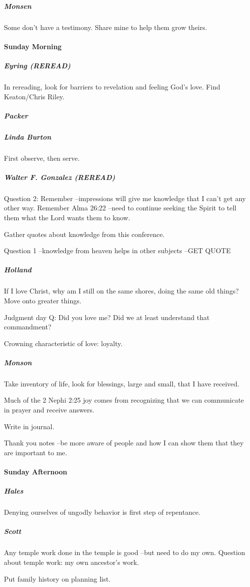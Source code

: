 \subparagraph*{Monsen} Some don't have a testimony. Share mine to help them grow theirs.

\paragraph*{Sunday Morning}

\subparagraph*{Eyring (REREAD)} In rereading, look for barriers to revelation and feeling God's love. Find Keaton/Chris Riley.

\subparagraph*{Packer}

\subparagraph*{Linda Burton} First observe, then serve.

\subparagraph*{Walter F. Gonzalez (REREAD)} Question 2: Remember --impressions will give me knowledge that I can't get any other way. Remember Alma 26:22 --need to continue seeking the Spirit to tell them what the Lord wants them to know.

Gather quotes about knowledge from this conference.

Question 1 --knowledge from heaven helps in other subjects --GET QUOTE

\subparagraph*{Holland} If I love Christ, why am I still on the same shores, doing the same old things? Move onto greater things.

Judgment day Q: Did you love me? Did we at least understand that commandment?

Crowning characteristic of love: loyalty.

\subparagraph*{Monson} Take inventory of life, look for blessings, large and small, that I have received.

Much of the 2 Nephi 2:25 joy comes from recognizing that we can communicate in prayer and receive answers.

Write in journal.

Thank you notes --be more aware of people and how I can show them that they are important to me.

\paragraph*{Sunday Afternoon}

\subparagraph*{Hales} Denying ourselves of ungodly behavior is first step of repentance.

\subparagraph*{Scott} Any temple work done in the temple is good --but need to do my own. Question about temple work: my own ancestor's work.

Put family history on planning list.

